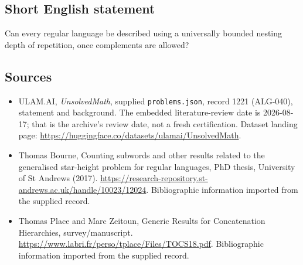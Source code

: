 \documentclass[11pt,a4paper]{article}
\begin{document}
\subsection{Short English statement}

Can every regular language be described using a universally bounded nesting depth of repetition, once complements are allowed?

\subsection{Sources}

{\small

\begin{itemize}

\item[\hypertarget{source:1221:1}{S1}] ULAM.AI, \emph{UnsolvedMath}, supplied \texttt{problems.json}, record 1221 (ALG-040), statement and background. The embedded literature-review date is 2026-08-17; that is the archive’s review date, not a fresh certification. Dataset landing page: \url{https://huggingface.co/datasets/ulamai/UnsolvedMath}.

\item[\hypertarget{source:1221:2}{S2}] Thomas Bourne, Counting subwords and other results related to the generalised star-height problem for regular languages, PhD thesis, University of St Andrews (2017). \url{https://research-repository.st-andrews.ac.uk/handle/10023/12024}. Bibliographic information imported from the supplied record.

\item[\hypertarget{source:1221:3}{S3}] Thomas Place and Marc Zeitoun, Generic Results for Concatenation Hierarchies, survey/manuscript. \url{https://www.labri.fr/perso/tplace/Files/TOCS18.pdf}. Bibliographic information imported from the supplied record.

\end{itemize}

}

\label{end:1221}
\end{document}
